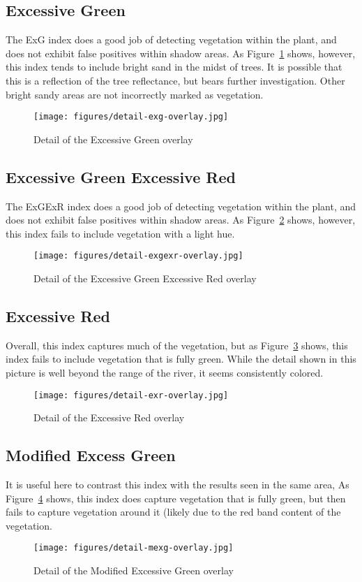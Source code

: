 \documentclass[letterpaper]{article}
\begin{document}
{{\subsection{Excessive Green}
The ExG index does a good job of detecting vegetation within the plant, and does not exhibit false positives within shadow areas. As Figure~\ref{fig:detail-exg} shows, however, this index tends to include bright sand in the midst of trees. It is possible that this is a reflection of the tree reflectance, but bears further investigation. Other bright sandy areas are not incorrectly marked as vegetation.
\begin{figure}[H]
	\centering
	\texttt{[image: figures/detail-exg-overlay.jpg]}
	\caption{Detail of the Excessive Green overlay}
	\label{fig:detail-exg}
\end{figure}

\subsection{Excessive Green Excessive Red}
The ExGExR index does a good job of detecting vegetation within the plant, and does not exhibit false positives within shadow areas. As Figure~\ref{fig:detail-exgexr} shows, however, this index fails to include vegetation with a light hue.
\begin{figure}[H]
	\centering
	\texttt{[image: figures/detail-exgexr-overlay.jpg]}
	\caption{Detail of the Excessive Green Excessive Red overlay}
	\label{fig:detail-exgexr}
\end{figure}

\subsection{Excessive Red}
Overall, this index captures much of the vegetation, but as Figure~\ref{fig:detail-exr} shows, this index fails to include vegetation that is fully green. While the detail shown in this picture is well beyond the range of the river, it seems consistently colored.
\begin{figure}[H]
	\centering
	\texttt{[image: figures/detail-exr-overlay.jpg]}
	\caption{Detail of the Excessive Red overlay}
	\label{fig:detail-exr}
\end{figure}

\subsection{Modified Excess Green}
It is useful here to contrast this index with the results seen in the same area, As Figure~\ref{fig:detail-mexg} shows, this index does capture vegetation that is fully green, but then fails to capture vegetation around it (likely due to the red band content of the vegetation.
\begin{figure}[H]
	\centering
	\texttt{[image: figures/detail-mexg-overlay.jpg]}
	\caption{Detail of the Modified Excessive Green overlay}
	\label{fig:detail-mexg}
\end{figure}

}}
\end{document}
